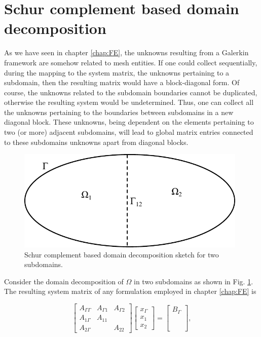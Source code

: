 \section{Schur complement based domain decomposition}\label{sec:SchurDD}

As we have seen in chapter \ref{chap:FE}, the unknowns resulting from a Galerkin framework are somehow related to mesh entities. If one could collect sequentially, during the mapping to the system matrix, the unknowns pertaining to a subdomain, then the resulting matrix would have a block-diagonal form. Of course, the unknowns related to the subdomain boundaries cannot be duplicated, otherwise the resulting system would be undetermined. Thus, one can collect all the unknowns pertaining to the boundaries between subdomains in a new diagonal block. These unknowns, being dependent on the elements pertaining to two (or more) adjacent subdomains, will lead to global matrix entries connected to these subdomains unknowns apart from diagonal blocks.

\begin{figure}[ht!]
\centering
\includegraphics[width=11cm]{DDSchur2}
\caption{Schur complement based domain decomposition sketch for two subdomains.}
\label{fig:DDSchur2}
\end{figure}

Consider the domain decomposition of $\Omega$ in two subdomains as shown in Fig. \ref{fig:DDSchur2}. The resulting system matrix of any formulation employed in chapter \ref{chap:FE} is

\begin{equation}
\label{eq:DDSchurFull}
\begin{bmatrix}
A_{\Gamma\Gamma} & A_{\Gamma1} & A_{\Gamma2}\\
A_{1\Gamma} & A_{11} & \\
A_{2\Gamma} &  & A_{22}
\end{bmatrix}
\begin{bmatrix}
x_{\Gamma}\\
x_{1}\\
x_{2}
\end{bmatrix}
=
\begin{bmatrix}
B_{\Gamma}\\
\phantom{B}\\
\phantom{B}
\end{bmatrix},
\end{equation}


